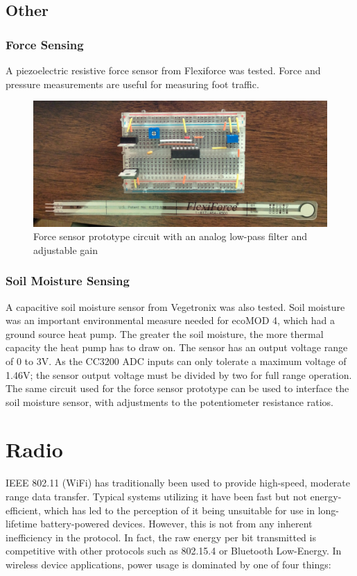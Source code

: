 \subsection{Other}
\subsubsection{Force Sensing}
A piezoelectric resistive force sensor from Flexiforce was tested. Force and pressure measurements are useful for measuring foot traffic. 

\begin{figure}[h]
\centering
\includegraphics[width=0.33\linewidth]{images/force-proto}
\caption[Force sensor prototype]{Force sensor prototype circuit with an analog low-pass filter and adjustable gain}
\label{fig:force-proto}
\end{figure}

\subsubsection{Soil Moisture Sensing}
A capacitive soil moisture sensor from Vegetronix was also tested. Soil moisture was an important environmental measure needed for ecoMOD 4, which had a ground source heat pump. The greater the soil moisture, the more thermal capacity the heat pump has to draw on. The sensor has an output voltage range of 0 to 3V. As the CC3200 ADC inputs can only tolerate a maximum voltage of 1.46V; the sensor output voltage must be divided by two for full range operation. The same circuit used for the force sensor prototype can be used to interface the soil moisture sensor, with adjustments to the potentiometer resistance ratios.

\section{Radio}

IEEE 802.11 (WiFi) has traditionally been used to provide high-speed, moderate range data transfer. Typical systems utilizing it have been fast but not energy-efficient, which has led to the perception of it being unsuitable for use in long-lifetime battery-powered devices. However, this is not from any inherent inefficiency in the protocol. In fact, the raw energy per bit transmitted is competitive with other protocols such as 802.15.4 or Bluetooth Low-Energy\cite{DanielDobkin2009}. In wireless device applications, power usage is dominated by one of four things:


